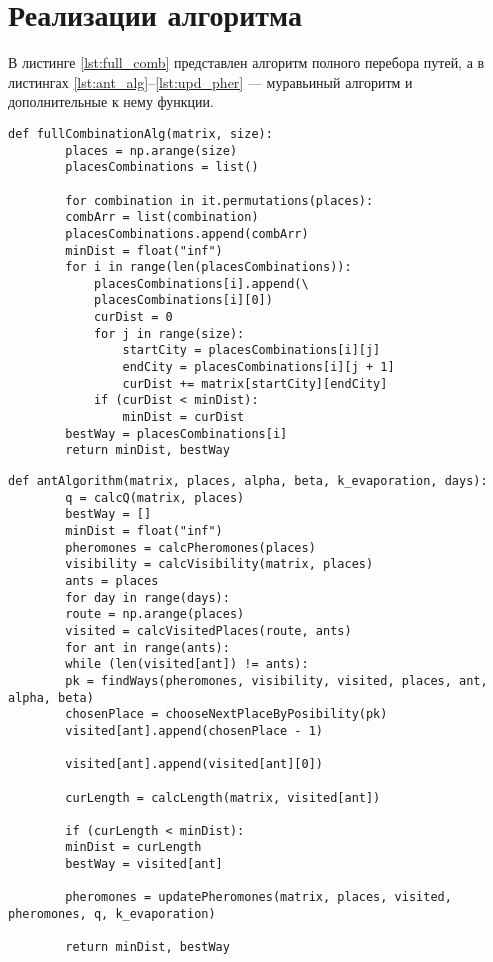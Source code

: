 \section{Реализации алгоритма}
В листинге \ref{lst:full_comb} представлен алгоритм полного перебора путей, а в листингах \ref{lst:ant_alg}--\ref{lst:upd_pher} --- муравьиный алгоритм и дополнительные к нему функции.


\begin{center}
	\captionsetup{justification=raggedright,singlelinecheck=off}
	\begin{lstlisting}[label=lst:full_comb,caption=Реализация алгоритма полного перебора путей]
	def fullCombinationAlg(matrix, size):
		places = np.arange(size)
		placesCombinations = list()
		
		for combination in it.permutations(places):
		combArr = list(combination)
		placesCombinations.append(combArr)
		minDist = float("inf")
		for i in range(len(placesCombinations)):
			placesCombinations[i].append(\
			placesCombinations[i][0])
			curDist = 0
			for j in range(size):
				startCity = placesCombinations[i][j]
				endCity = placesCombinations[i][j + 1]
				curDist += matrix[startCity][endCity]
			if (curDist < minDist):
				minDist = curDist
		bestWay = placesCombinations[i]
		return minDist, bestWay
	\end{lstlisting}
\end{center}


\begin{center}
	\captionsetup{justification=raggedright,singlelinecheck=off}
	\begin{lstlisting}[label=lst:ant_alg,caption=Реализация муравьиного алгоритма]
	def antAlgorithm(matrix, places, alpha, beta, k_evaporation, days):
		q = calcQ(matrix, places)
		bestWay = []
		minDist = float("inf")
		pheromones = calcPheromones(places)
		visibility = calcVisibility(matrix, places)
		ants = places
		for day in range(days):
		route = np.arange(places)
		visited = calcVisitedPlaces(route, ants)
		for ant in range(ants):
		while (len(visited[ant]) != ants):
		pk = findWays(pheromones, visibility, visited, places, ant, alpha, beta)
		chosenPlace = chooseNextPlaceByPosibility(pk)
		visited[ant].append(chosenPlace - 1)
		
		visited[ant].append(visited[ant][0])
		
		curLength = calcLength(matrix, visited[ant])
		
		if (curLength < minDist):
		minDist = curLength
		bestWay = visited[ant]
		
		pheromones = updatePheromones(matrix, places, visited, pheromones, q, k_evaporation)
		
		return minDist, bestWay
	\end{lstlisting}
\end{center}


